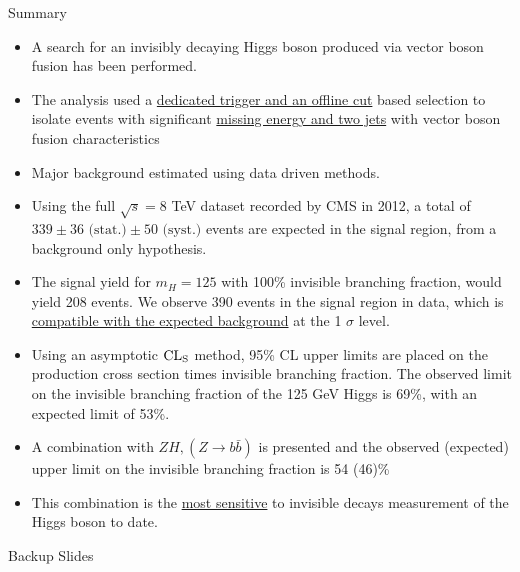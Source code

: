 \documentclass[8pt]{beamer}
\newcommand{\stat}{\text{ (stat.)}}
\newcommand{\syst}{\text{ (syst.)}}
\begin{document}
\begin{frame}{Summary}

\begin{block}

\begin{itemize}
 \item A search for an invisibly decaying Higgs boson produced via vector boson fusion has been performed. 
 \item The analysis used a \uline{dedicated trigger and an offline cut} based selection to isolate events with significant \uline{missing energy and two jets} with vector boson fusion characteristics
 \item Major background estimated using data driven methods.  
 \item Using the full $\sqrt{s}=8$ TeV dataset recorded by CMS in 2012, a total of $339 \pm 36 \stat \pm 50 \syst$ events are expected in the signal region, from a background only hypothesis.
 \item The signal yield for $m_H = 125$ with 100\% invisible branching fraction, would yield 208 events. We observe 390 events in the signal region in data, which is \uline{compatible with the expected background} at the 1 $\sigma$ level.
 \item Using an asymptotic ${\rm CL}_{\rm S}$ method, 95\% CL upper limits are placed on the production cross section times invisible branching fraction.  The observed limit on the invisible branching fraction of the 125 GeV Higgs is 69\%, with an expected limit of 53\%.  
 \item A combination with $ZH, (Z \rightarrow b\bar{b})$ is presented and the observed (expected) upper limit on the invisible branching fraction is 54 (46)\%
 \item This combination is the \uline{most sensitive} to invisible decays measurement of the Higgs boson to date.
\end{itemize}

\end{block}

\end{frame}

\appendix
\begin{frame}
 
\begin{block}

\begin{center}Backup Slides\end{center}

\end{block}

\end{frame}
\end{document}
